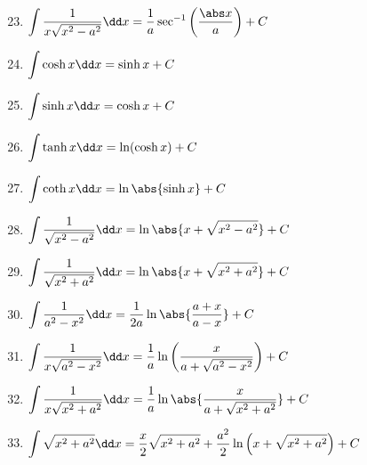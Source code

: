 \parbox[t]{.36\linewidth}{%
\begin{enumerate}\setcounter{enumi}{22}
\item $\ds\int\frac1{x\sqrt{x^2-a^2}}\dd x=\frac1a\sec^{-1}\left(\frac{\abs x}{a}\right)+C$
\item $\ds\int\cosh x\dd x=\sinh x+C$
\item $\ds\int\sinh x\dd x=\cosh x+C$
\item $\ds\int\tanh x\dd x=\ln(\cosh x)+C$
\item $\ds\int\coth x\dd x=\ln\abs{\sinh x}+C$
\item $\ds\int\frac1{\sqrt{x^2-a^2}}\dd x=\ln\abs{x+\sqrt{x^2-a^2}}+C\\{\scriptstyle\phantom{1}}$
\item $\ds\int\frac1{\sqrt{x^2+a^2}}\dd x=\ln\abs{x+\sqrt{x^2+a^2}}+C$
\item $\ds\int\frac1{a^2-x^2}\dd x=\frac1{2a}\ln\abs{\frac{a+x}{a-x}}+C$
\item $\ds\int\frac1{x\sqrt{a^2-x^2}}\dd x=\frac1a\ln\left(\frac x{a+\sqrt{a^2-x^2}}\right)+C$
\item $\ds\int\frac1{x\sqrt{x^2+a^2}}\dd x=\frac1a\ln\abs{\frac{x}{a+\sqrt{x^2+a^2}}}+C$
\item $\ds\int\sqrt{x^2+a^2}\dd x=\vphantom{\frac1{x^2}}\\
\null\hfill\ds\frac x2\sqrt{x^2+a^2}+\frac{a^2}2\ln\left(x+\sqrt{x^2+a^2}\right)+C$
\end{enumerate}}
\egroup


\clearpage

